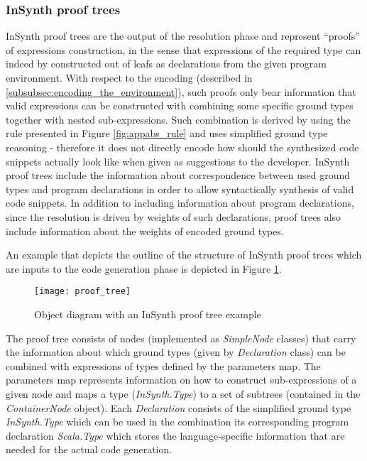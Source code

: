\subsubsection{InSynth proof trees}

InSynth proof trees are the output of the resolution phase and represent ``proofs'' of expressions construction, in the sense that expressions of the required type can indeed by constructed out of leafs as declarations from the given program environment.
With respect to the encoding (described in \ref{subsubsec:encoding_the_environment}), such proofs only bear information that valid expressions can be constructed with combining some specific ground types together with nested sub-expressions.
Such combination is derived by using the rule presented in Figure \ref{fig:appabs_rule} and uses simplified ground type reasoning - therefore it does not directly encode how should the synthesized code snippets actually look like when given as suggestions to the developer.
InSynth proof trees include the information about correspondence between used ground types and program declarations in order to allow syntactically synthesis of valid code snippets.
In addition to including information about program declarations, since the resolution is driven by weights of such declarations, proof trees also include information about the weights of encoded ground types.

An example that depicts the outline of the structure of InSynth proof trees which are inputs to the code generation phase is depicted in Figure \ref{fig:InSynth_tree_example}.

\begin{figure}[ht]
\centering
\texttt{[image: proof\_tree]}
\caption{Object diagram with an InSynth proof tree example}
\label{fig:InSynth_tree_example}
\end{figure}


The proof tree consists of nodes (implemented as \textit{SimpleNode} classes) that carry the information about which ground types (given by \textit{Declaration} class) can be combined with expressions of types defined by the parameters map.
The parameters map represents information on how to construct sub-expressions of a given node and maps a type (\textit{InSynth.Type}) to a set of subtrees (contained in the \textit{ContainerNode} object).
Each \textit{Declaration} consists of the simplified ground type \textit{InSynth.Type} which can be used in the combination its corresponding program declaration \textit{Scala.Type} which stores the language-specific information that are needed for the actual code generation. 

